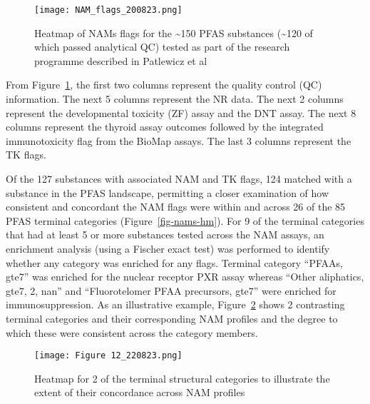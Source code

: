 \documentclass[
  super,
  preprint,
  3p]{elsarticle}
\begin{document}
\begin{figure}

{\centering \texttt{[image: NAM\_flags\_200823.png]}

}

\caption{\label{fig-nams}Heatmap of NAMs flags for the
\textasciitilde150 PFAS substances (\textasciitilde120 of which passed
analytical QC) tested as part of the research programme described in
Patlewicz et al \citep{patlewicz_towards_2022}}

\end{figure}

From Figure~\ref{fig-nams}, the first two columns represent the quality
control (QC) information. The next 5 columns represent the NR data. The
next 2 columns represent the developmental toxicity (ZF) assay and the
DNT assay. The next 8 columns represent the thyroid assay outcomes
followed by the integrated immunotoxicity flag from the BioMap assays.
The last 3 columns represent the TK flags.

Of the 127 substances with associated NAM and TK flags, 124 matched with
a substance in the PFAS landscape, permitting a closer examination of
how consistent and concordant the NAM flags were within and across 26 of
the 85 PFAS terminal categories (Figure~\ref{fig-nams-hm}). For 9 of the
terminal categories that had at least 5 or more substances tested across
the NAM assays, an enrichment analysis (using a Fischer exact test) was
performed to identify whether any category was enriched for any flags.
Terminal category ``PFAAs, gte7'' was enriched for the nuclear receptor
PXR assay whereas ``Other aliphatics, gte7, 2, nan'' and ``Fluorotelomer
PFAA precursors, gte7'' were enriched for immunosuppression. As an
illustrative example, Figure~\ref{fig-nams-struct} shows 2 contrasting
terminal categories and their corresponding NAM profiles and the degree
to which these were consistent across the category members.

\begin{figure}

{\centering \texttt{[image: Figure 12\_220823.png]}

}

\caption{\label{fig-nams-struct}Heatmap for 2 of the terminal structural
categories to illustrate the extent of their concordance across NAM
profiles}

\end{figure}
\end{document}
